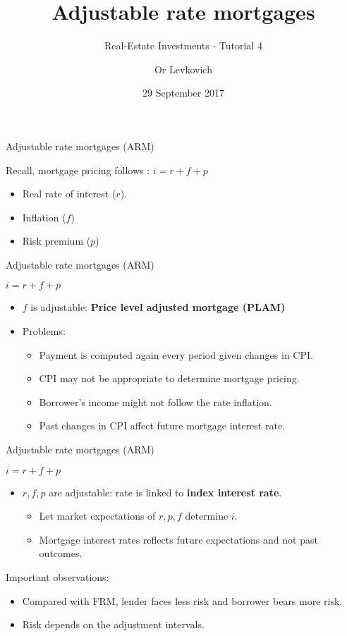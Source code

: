 \documentclass[ignorenonframetext,]{beamer}
\title{Adjustable rate mortgages}
\subtitle{Real-Estate Investments - Tutorial 4}
\author{Or Levkovich}
\date{29 September 2017}
\providecommand{\tightlist}{%
\setlength{\itemsep}{0pt}\setlength{\parskip}{0pt}}
\begin{document}
\frame{\titlepage}

\begin{frame}{Adjustable rate mortgages (ARM)}

Recall, mortgage pricing follows : \(i = r + f + p\)

\begin{itemize}
\tightlist
\item
  Real rate of interest (\(r\)).
\item
  Inflation (\(f\))
\item
  Risk premium (\(p\))
\end{itemize}

\end{frame}

\begin{frame}{Adjustable rate mortgages (ARM)}

\(i = r + f + p\)

\begin{itemize}
\item
  \(f\) is adjustable: \textbf{Price level adjusted mortgage (PLAM)}
\item
  Problems:

  \begin{itemize}
  \tightlist
  \item
    Payment is computed again every period given changes in CPI.
  \item
    CPI may not be appropriate to determine mortgage pricing.
  \item
    Borrower's income might not follow the rate inflation.
  \item
    Past changes in CPI affect future mortgage interest rate.
  \end{itemize}
\end{itemize}

\end{frame}

\begin{frame}{Adjustable rate mortgages (ARM)}

\(i = r + f + p\)

\begin{itemize}
\tightlist
\item
  \(r, f, p\) are adjustable: rate is linked to \textbf{index interest
  rate}.

  \begin{itemize}
  \tightlist
  \item
    Let market expectations of \(r, p, f\) determine \(i\).
  \item
    Mortgage interest rates reflects future expectations and not past
    outcomes.
  \end{itemize}
\end{itemize}

Important observations:

\begin{itemize}
\tightlist
\item
  Compared with FRM, lender faces less risk and borrower bears more
  risk.
\item
  Risk depends on the adjustment intervals.
\end{itemize}

\end{frame}
\end{document}
